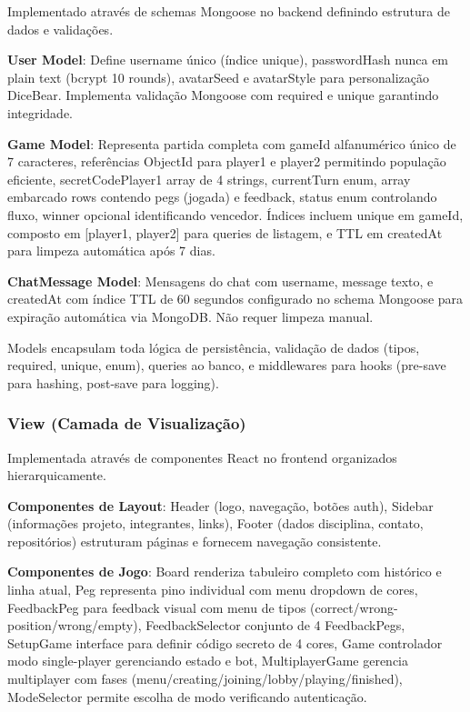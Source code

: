 \documentclass[conference]{IEEEtran}
\begin{document}
Implementado através de schemas Mongoose \cite{mongodb:2024} no backend definindo estrutura de dados e validações.

\textbf{User Model}: Define username único (índice unique), passwordHash nunca em plain text (bcrypt \cite{bcrypt:2024} 10 rounds), avatarSeed e avatarStyle para personalização DiceBear. Implementa validação Mongoose com required e unique garantindo integridade.

\textbf{Game Model}: Representa partida completa com gameId alfanumérico único de 7 caracteres, referências ObjectId para player1 e player2 permitindo população eficiente, secretCodePlayer1 array de 4 strings, currentTurn enum, array embarcado rows contendo pegs (jogada) e feedback, status enum controlando fluxo, winner opcional identificando vencedor. Índices incluem unique em gameId, composto em [player1, player2] para queries de listagem, e TTL em createdAt para limpeza automática após 7 dias.

\textbf{ChatMessage Model}: Mensagens do chat com username, message texto, e createdAt com índice TTL de 60 segundos configurado no schema Mongoose para expiração automática via MongoDB. Não requer limpeza manual.

Models encapsulam toda lógica de persistência, validação de dados (tipos, required, unique, enum), queries ao banco, e middlewares para hooks (pre-save para hashing, post-save para logging).

\subsubsection{View (Camada de Visualização)}

Implementada através de componentes React \cite{react:2024} no frontend organizados hierarquicamente.

\textbf{Componentes de Layout}: Header (logo, navegação, botões auth), Sidebar (informações projeto, integrantes, links), Footer (dados disciplina, contato, repositórios) estruturam páginas e fornecem navegação consistente.

\textbf{Componentes de Jogo}: Board renderiza tabuleiro completo com histórico e linha atual, Peg representa pino individual com menu dropdown de cores, FeedbackPeg para feedback visual com menu de tipos (correct/wrong-position/wrong/empty), FeedbackSelector conjunto de 4 FeedbackPegs, SetupGame interface para definir código secreto de 4 cores, Game controlador modo single-player gerenciando estado e bot, MultiplayerGame gerencia multiplayer com fases (menu/creating/joining/lobby/playing/finished), ModeSelector permite escolha de modo verificando autenticação.
\end{document}
